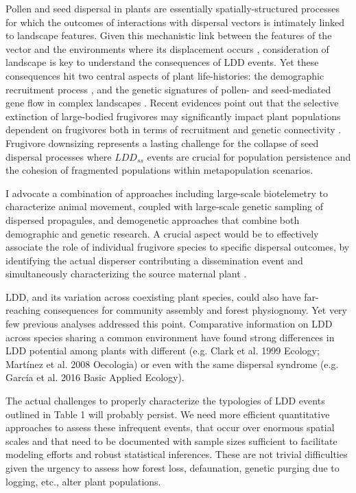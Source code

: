 \documentclass[a4paper, 12pt]{article}
\begin{document}
\begin{linenumbers}
Pollen and seed dispersal in plants are essentially spatially-structured processes for which the outcomes of interactions with dispersal vectors is intimately linked to landscape features. Given this mechanistic link between the features of the vector and the environments where its displacement occurs \citep{Nathan:2008fx}, consideration of landscape is key to understand the consequences of LDD events. Yet these consequences hit two central aspects of plant life-histories: the demographic recruitment process \citep{Harper:1977aa}, and the genetic signatures of pollen- and seed-mediated gene flow in complex landscapes \citep{Sork:1999}. Recent evidences point out that the selective extinction of large-bodied frugivores may significantly impact plant populations dependent on frugivores both in terms  of recruitment \citep{Traveset:2012he,PerezMendez:2015hya} and genetic connectivity \citep{Perez-Mendez:2016dz}. Frugivore downsizing represents a lasting challenge for the collapse of seed dispersal processes where $LDD_{ss}$ events are crucial for population persistence and the cohesion of fragmented populations within metapopulation scenarios.

I advocate \citep[also see ][]{Jordano:2002tr,Nathan:2003qe,Jones:2008il,Hardesty:2011jn} a combination of approaches including large-scale biotelemetry to characterize animal movement, coupled with large-scale genetic sampling of dispersed propagules, and demogenetic approaches that combine both demographic and genetic research. A crucial aspect would be to effectively associate the role of individual frugivore species to specific dispersal outcomes, by identifying the actual disperser contributing a dissemination event \citep{GonzalezVaro:2014ij} and simultaneously characterizing the source maternal plant \citep{Jordano:2002tr}.

LDD, and its variation across coexisting plant species, could also have far-reaching consequences for community assembly and forest physiognomy. Yet very few previous analyses addressed this point. Comparative information on LDD across species sharing a common environment have found strong differences in LDD potential among plants with different (e.g. Clark et al. 1999 Ecology; Martínez et al. 2008 Oecologia) or even with the same dispersal syndrome (e.g. García et al. 2016 Basic Applied Ecology).

The actual challenges to properly characterize the typologies of LDD events outlined in Table 1 will probably persist. We need more efficient quantitative approaches to assess these infrequent events, that occur over enormous spatial scales and that need to be documented with sample sizes sufficient to facilitate modeling efforts and robust statistical inferences. These are not trivial difficulties given the urgency to assess how forest loss, defaunation, genetic purging due to logging, etc., alter plant populations. 





\end{linenumbers}
\end{document}
